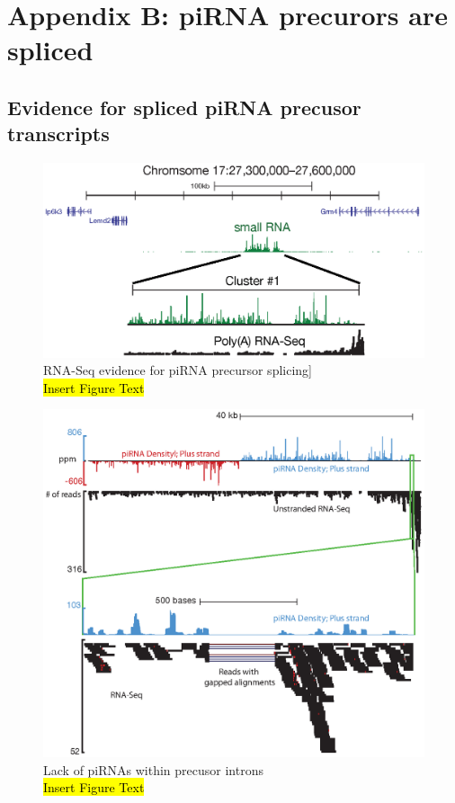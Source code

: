 \chapter{Appendix B: piRNA precurors are spliced} \label{AppendixB} 

\section{Evidence for spliced piRNA precusor transcripts}

\begin{figure}[htbp]
	\centering 
	\includegraphics{Figures/AppendixB/evidenceForPrecursorSplicing.eps}
	\caption[RNA-Seq evidence for piRNA precursor splicing]
	{
		RNA-Seq evidence for piRNA precursor splicing]\\
		\hl{Insert Figure Text}
	}
	\label{fig:evidence for precusor splicing}
\end{figure}

\begin{figure}[htbp]
	\centering 
	\includegraphics{Figures/AppendixB/noPiRNAswithinPrecusorIntrons.eps}
	\caption[Lack of piRNAs within precusor introns]
	{
		Lack of piRNAs within precusor introns\\
		\hl{Insert Figure Text}
	}
	\label{fig:no piRNAs withing Precursor Introns}
\end{figure}

